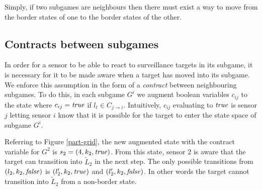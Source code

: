 Simply, if two subgames are neighbours then there must exist a way to move from the border states of one to the border states of the other. 

\subsection{Contracts between subgames}
In order for a sensor to be able to react to surveillance targets in its subgame, it is necessary for it to be made aware when a target has moved into its subgame. We enforce this assumption in the form of a \emph{contract} between neighbouring subgames. To do this, in each subgame $G^i$ we augment boolean variables $c_{ij}$ to the state where $c_{ij} = \mathit{true}$ if $l_t \in C_{j \rightarrow i}$. Intuitively, $c_{ij}$ evaluating to $\mathit{true}$ is sensor $j$ letting sensor $i$ know that it is possible for the target to enter the state space of subgame $G^i$. 
\begin{example}
Referring to Figure \ref{part-grid}, the new augmented state with the contract variable for $G^2$ is $s_2 = (4,k_2,\mathit{true})$. From this state, sensor $2$ is aware that the target can transition into $\widetilde{L}_2$ in the next step. The only possible transitions from $(l_2,k_2, \mathit{false})$ is $(l_2',k_2, \mathit{true})$ and $(l_2',k_2, \mathit{false})$. In other words the target cannot transition into $\widetilde{L}_2$ from a non-border state. 
\end{example}